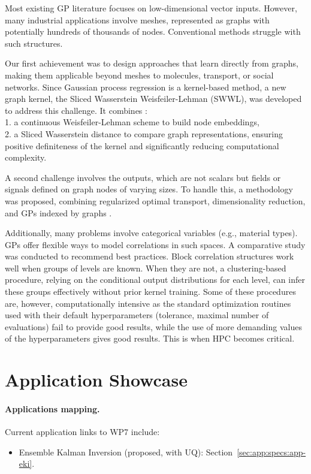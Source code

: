 Most existing GP literature focuses on low-dimensional vector inputs. However, many industrial applications involve meshes, represented as graphs with potentially hundreds of thousands of nodes. Conventional methods struggle with such structures.

Our first achievement was to design approaches that learn directly from graphs, making them applicable beyond meshes to molecules, transport, or social networks.
Since Gaussian process regression is a kernel-based method,
a new graph kernel, the Sliced Wasserstein Weisfeiler-Lehman (SWWL), was developed to address this challenge. It combines \cite{carpintero2024}:\\
	1.	a continuous Weisfeiler-Lehman scheme to build node embeddings,\\
	2.	a Sliced Wasserstein distance to compare graph representations, ensuring positive definiteness of the kernel and significantly reducing computational complexity.

A second challenge involves the outputs, which are not scalars but fields or signals defined on graph nodes of varying sizes. To handle this, a methodology was proposed, combining regularized optimal transport, dimensionality reduction, and GPs indexed by graphs \cite{carpintero2025}.

Additionally, many problems involve categorical variables (e.g., material types). GPs offer flexible ways to model correlations in such spaces. A comparative study was conducted to recommend best practices. Block correlation structures work well when groups of levels are known. When they are not, a clustering-based procedure, relying on the conditional output distributions for each level, can infer these groups effectively without prior kernel training.
Some of these procedures are, however, computationally intensive as the standard optimization routines used with their default hyperparameters (tolerance, maximal number of evaluations) fail to provide good results, while the use of more demanding values of the hyperparameters gives good results. This is when HPC becomes critical.

\section{Application Showcase}
%   

\paragraph{Applications mapping.} Current application links to WP7 include:
\begin{itemize}
	\item Ensemble Kalman Inversion (proposed, with UQ): Section~\ref{sec:app:specs:app-eki}.
\end{itemize}

